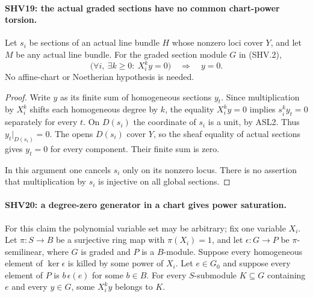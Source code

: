 \documentclass[11pt,a4paper]{article}
\numberwithin{equation}{section}
\theoremstyle{remark}\newtheorem{remark}[theorem]{Remark}
\begin{document}
\paragraph{SHV19: the actual graded sections have no common chart-power torsion.}
\label{claim:SHV19}
Let $s_i$ be sections of an actual line bundle $H$ whose
nonzero loci cover $Y$, and let $M$ be any actual line bundle.
For the graded section module $G$ in (SHV.2),
\[
       \bigl(\forall i,\ \exists k\ge0:\ X_i^k y=0\bigr)
                    \quad\Longrightarrow\quad y=0 .
                                                        \tag{SHV.29}
\]
No affine-chart or Noetherian hypothesis is needed.

\begin{proof}
Write $y$ as its finite sum of homogeneous sections $y_t$.
Since multiplication by $X_i^k$ shifts each homogeneous
degree by $k$, the equality $X_i^k y=0$ implies
$s_i^k y_t=0$ separately for every $t$.  On $D(s_i)$
the coordinate of $s_i$ is a unit, by ASL2.  Thus
$y_t|_{D(s_i)}=0$.  The opens $D(s_i)$ cover $Y$,
so the sheaf equality of actual sections gives $y_t=0$
for every component.  Their finite sum is zero.

In this argument one cancels $s_i$ only on its nonzero
locus.  There is no assertion that multiplication by $s_i$
is injective on all global sections.
\end{proof}

\paragraph{SHV20: a degree-zero generator in a chart gives power saturation.}
\label{claim:SHV20}
For this claim the polynomial variable set may be arbitrary;
fix one variable $X_i$.
Let $\pi:S\to B$ be a surjective ring map with $\pi(X_i)=1$,
and let $\epsilon:G\to P$ be $\pi$-semilinear, where $G$ is
graded and $P$ is a $B$-module.  Suppose every homogeneous
element of $\ker\epsilon$ is killed by some power of $X_i$.
Let $e\in G_0$ and suppose every element of $P$ is
$b\,\epsilon(e)$ for some $b\in B$.  For every $S$-submodule
$K\subseteq G$ containing $e$ and every $y\in G$, some
$X_i^k y$ belongs to $K$.
\end{document}
